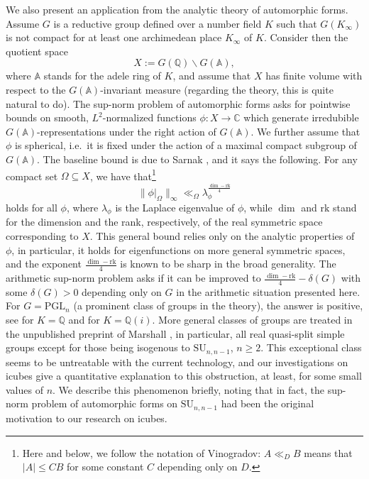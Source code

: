 \documentclass[11pt]{amsart}
\newcommand{\QQ}{\mathbb{Q}}
\theoremstyle{definition}
\theoremstyle{remark}
\begin{document}
We also present an application from the analytic theory of automorphic forms. Assume $G$ is a reductive group defined over a number field $K$ such that $G(K_{\infty})$ is not compact for at least one archimedean place $K_{\infty}$ of $K$. Consider then the quotient space
\[
X:=G(\QQ)\backslash G(\mathbb{A}),
\]
where $\mathbb{A}$ stands for the adele ring of $K$, and assume that $X$ has finite volume with respect to the $G(\mathbb{A})$-invariant measure (regarding the theory, this is quite natural to do). The sup-norm problem of automorphic forms asks for pointwise bounds on smooth, $L^2$-normalized functions $\phi:X\to\mathbb{C}$ which generate irredubible $G(\mathbb{A})$-representations under the right action of $G(\mathbb{A})$. We further assume that $\phi$ is spherical, i.e.~it is fixed under the action of a maximal compact subgroup of $G(\mathbb{A})$. The baseline bound is due to Sarnak \cite{Sarnak2004L}, and it says the following. For any compact set $\Omega\subseteq X$, we have that\footnote{Here and below, we follow the notation of Vinogradov: $A\ll_D B$ means that $|A|\leq CB$ for some constant $C$ depending only on $D$.}
\[
\|\phi|_{\Omega}\|_{\infty} \ll_{\Omega} \lambda_{\phi}^{\frac{\dim-\mathrm{rk}}{4}}
\]
holds for all $\phi$, where $\lambda_{\phi}$ is the Laplace eigenvalue of $\phi$, while $\dim$ and $\mathrm{rk}$ stand for the dimension and the rank, respectively, of the real symmetric space corresponding to $X$. This general bound relies only on the analytic properties of $\phi$, in particular, it holds for eigenfunctions on more general symmetric spaces, and the exponent $\frac{\dim-\mathrm{rk}}{4}$ is known to be sharp in the broad generality. The arithmetic sup-norm problem asks if it can be improved to $\frac{\dim-\mathrm{rk}}{4}-\delta(G)$ with some $\delta(G)>0$ depending only on $G$ in the arithmetic situation presented here. For $G=\mathrm{PGL}_n$ (a prominent class of groups in the theory), the answer is positive, see \cite{BlomerMagaSelecta} for $K=\QQ$ and \cite{MagaZabradi} for $K=\QQ(i)$. More general classes of groups are treated in the unpublished preprint of Marshall \cite{Marshall}, in particular, all real quasi-split simple groups except for those being isogenous to $\mathrm{SU}_{n,n-1}$, $n \geq 2$. This exceptional class seems to be untreatable with the current technology, and our investigations on icubes give a quantitative explanation to this obstruction, at least, for some small values of $n$. We describe this phenomenon briefly, noting that in fact, the sup-norm problem of automorphic forms on $\mathrm{SU}_{n,n-1}$ had been the original motivation to our research on icubes.
\end{document}
